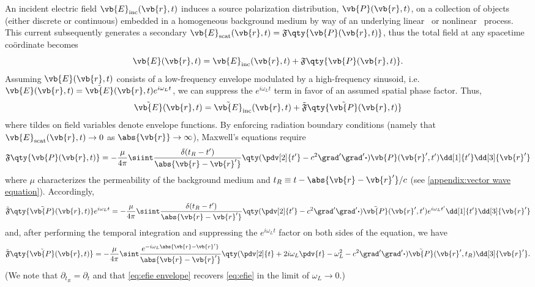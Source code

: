 An incident electric field $\vb{E}_\text{inc}(\vb{r}, t)$ induces a source polarization distribution, $\vb{P}(\vb{r}, t)$, on a collection of objects (either discrete or continuous) embedded in a homogeneous background medium by way of an underlying linear~\cite{} or nonlinear~\cite{Glosser2017} process.
This current subsequently generates a secondary $\vb{E}_\text{scat}(\vb{r}, t) = \mathfrak{F}\qty{\vb{P}(\vb{r}, t)}$, thus the total field at any spacetime co\"ordinate becomes
\begin{equation}
  \vb{E}(\vb{r}, t) = \vb{E}_\text{inc}(\vb{r}, t) + \mathfrak{F}\qty{\vb{P}(\vb{r}, t)}.
\end{equation}
Assuming $\vb{E}(\vb{r}, t)$ consists of a low-frequency envelope modulated by a high-frequency sinusoid, i.e. $\vb{E}(\vb{r}, t) = \tilde{\vb{E}}(\vb{r}, t) e^{i \omega_L t}$, we can suppress the $e^{i \omega_L t}$ term in favor of an assumed spatial phase factor.
Thus,
\begin{equation}
  \tilde{\vb{E}}(\vb{r}, t) = \tilde{\vb{E}}_\text{inc}(\vb{r}, t) + \tilde{\mathfrak{F}}\qty{\tilde{\vb{P}}(\vb{r}, t)}
\end{equation}
where tildes on field variables denote envelope functions.
By enforcing radiation boundary conditions (namely that $\vb{E}_\text{scat}(\vb{r}, t) \to 0$ as $\abs{\vb{r}} \to \infty$), Maxwell's equations require
\begin{equation}
  \mathfrak{F}\qty{\vb{P}(\vb{r}, t)} = -\frac{\mu}{4\pi} \siint \frac{\delta(t_R - t')}{\abs{\vb{r} - \vb{r}'}} \qty(\pdv[2]{{t'}} - c^2 \grad' \grad'\boldsymbol{\cdot}) \vb{P}(\vb{r}', t') \dd[1]{t'} \dd[3]{\vb{r}'}
  \label{eq:efie}
\end{equation}
where $\mu$ characterizes the permeability of the background medium and $t_R \equiv t - \abs{\vb{r} - \vb{r}'}/c$ (see \cref{appendix:vector wave equation}).
Accordingly,
\begin{equation}
  \tilde{\mathfrak{F}}\qty{\tilde{\vb{P}}(\vb{r}, t)}e^{i \omega_L t} = -\frac{\mu}{4\pi} \siint \frac{\delta(t_R - t')}{\abs{\vb{r} - \vb{r}'}} \qty(\pdv[2]{{t'}} - c^2 \grad' \grad'\boldsymbol{\cdot}) \tilde{\vb{P}}(\vb{r}', t') e^{i \omega_L t'} \dd[1]{t'} \dd[3]{\vb{r}'}
  \label{eq:efie envelope}
\end{equation}
and, after performing the temporal integration and suppressing the $e^{i \omega_L t}$ factor on both sides of the equation, we have
\begin{equation}
  \tilde{\mathfrak{F}}\qty{\tilde{\vb{P}}(\vb{r}, t)} = -\frac{\mu}{4\pi} \sint \frac{e^{- i \omega_L \abs{\vb{r} - \vb{r}'}}}{\abs{\vb{r} - \vb{r}'}} \qty(\pdv[2]{t} + 2 i \omega_L \pdv{t} - \omega_L^2 - c^2 \grad' \grad'\boldsymbol{\cdot}) \tilde{\vb{P}}(\vb{r}', t_R) \dd[3]{\vb{r}'}.
  \label{eq:efie envelope}
\end{equation}
(We note that $\partial_{t_R} = \partial_{t}$ and that \cref{eq:efie envelope} recovers \cref{eq:efie} in the limit of $\omega_L \to 0$.)

